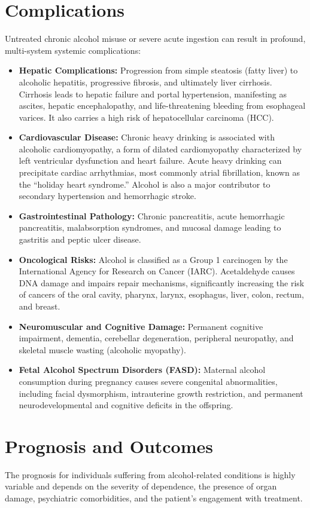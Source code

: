 \section*{Complications}
Untreated chronic alcohol misuse or severe acute ingestion can result in profound, multi-system systemic complications:

\begin{itemize}
    \item \textbf{Hepatic Complications:} Progression from simple steatosis (fatty liver) to alcoholic hepatitis, progressive fibrosis, and ultimately liver cirrhosis. Cirrhosis leads to hepatic failure and portal hypertension, manifesting as ascites, hepatic encephalopathy, and life-threatening bleeding from esophageal varices. It also carries a high risk of hepatocellular carcinoma (HCC).
    \item \textbf{Cardiovascular Disease:} Chronic heavy drinking is associated with alcoholic cardiomyopathy, a form of dilated cardiomyopathy characterized by left ventricular dysfunction and heart failure. Acute heavy drinking can precipitate cardiac arrhythmias, most commonly atrial fibrillation, known as the ``holiday heart syndrome.'' Alcohol is also a major contributor to secondary hypertension and hemorrhagic stroke.
    \item \textbf{Gastrointestinal Pathology:} Chronic pancreatitis, acute hemorrhagic pancreatitis, malabsorption syndromes, and mucosal damage leading to gastritis and peptic ulcer disease.
    \item \textbf{Oncological Risks:} Alcohol is classified as a Group 1 carcinogen by the International Agency for Research on Cancer (IARC). Acetaldehyde causes DNA damage and impairs repair mechanisms, significantly increasing the risk of cancers of the oral cavity, pharynx, larynx, esophagus, liver, colon, rectum, and breast.
    \item \textbf{Neuromuscular and Cognitive Damage:} Permanent cognitive impairment, dementia, cerebellar degeneration, peripheral neuropathy, and skeletal muscle wasting (alcoholic myopathy).
    \item \textbf{Fetal Alcohol Spectrum Disorders (FASD):} Maternal alcohol consumption during pregnancy causes severe congenital abnormalities, including facial dysmorphism, intrauterine growth restriction, and permanent neurodevelopmental and cognitive deficits in the offspring.
\end{itemize}

\section*{Prognosis and Outcomes}
The prognosis for individuals suffering from alcohol-related conditions is highly variable and depends on the severity of dependence, the presence of organ damage, psychiatric comorbidities, and the patient's engagement with treatment.

